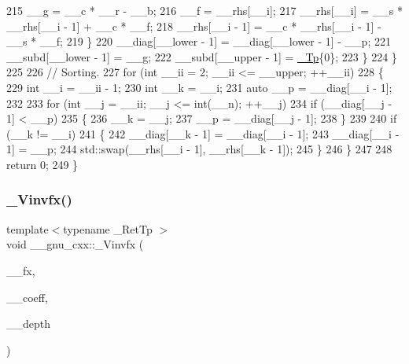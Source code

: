 \begin{DoxyCode}
215                   \_\_g = \_\_c * \_\_r - \_\_b;
216                   \_\_f = \_\_rhs[\_\_i];
217                   \_\_rhs[\_\_i] = \_\_s * \_\_rhs[\_\_i - 1] + \_\_c * \_\_f;
218                   \_\_rhs[\_\_i - 1] = \_\_c * \_\_rhs[\_\_i - 1] - \_\_s * \_\_f;
219                 \}
220               \_\_diag[\_\_lower - 1] = \_\_diag[\_\_lower - 1] - \_\_p;
221               \_\_subd[\_\_lower - 1] = \_\_g;
222               \_\_subd[\_\_upper - 1] = \hyperlink{namespace____gnu__cxx_a3b19a9c800ca194374ef9172290f7d79}{\_Tp}\{0\};
223             \}
224         \}
225 
226       \textcolor{comment}{// Sorting.}
227       \textcolor{keywordflow}{for} (\textcolor{keywordtype}{int} \_\_ii = 2; \_\_ii <= \_\_upper; ++\_\_ii)
228         \{
229           \textcolor{keywordtype}{int} \_\_i = \_\_ii - 1;
230           \textcolor{keywordtype}{int} \_\_k = \_\_i;
231           \textcolor{keyword}{auto} \_\_p = \_\_diag[\_\_i - 1];
232 
233           \textcolor{keywordflow}{for} (\textcolor{keywordtype}{int} \_\_j = \_\_ii; \_\_j <= int(\_\_n); ++\_\_j)
234             \textcolor{keywordflow}{if} (\_\_diag[\_\_j - 1] < \_\_p)
235               \{
236                 \_\_k = \_\_j;
237                 \_\_p = \_\_diag[\_\_j - 1];
238               \}
239 
240           \textcolor{keywordflow}{if} (\_\_k != \_\_i)
241             \{
242               \_\_diag[\_\_k - 1] = \_\_diag[\_\_i - 1];
243               \_\_diag[\_\_i - 1] = \_\_p;
244               std::swap(\_\_rhs[\_\_i - 1], \_\_rhs[\_\_k - 1]);
245             \}
246         \}
247 
248       \textcolor{keywordflow}{return} 0;
249     \}
\end{DoxyCode}
\mbox{\label{namespace____gnu__cxx_a6215f0335d2b6f478726299660ccca4e}} 
\subsubsection{\texorpdfstring{\+\_\+\+Vinvfx()}{\_Vinvfx()}}
{\footnotesize\ttfamily template$<$typename \+\_\+\+Ret\+Tp $>$ \\
void \+\_\+\+\_\+gnu\+\_\+cxx\+::\+\_\+\+Vinvfx (\begin{DoxyParamCaption}\item[{const std\+::array$<$ \hyperlink{namespace____gnu__cxx_a886e03ece3d53ff7fa6c098a40f93fa5}{\+\_\+\+Ret\+Tp}, 33 $>$ \&}]{\+\_\+\+\_\+fx,  }\item[{\hyperlink{namespace____gnu__cxx_a886e03ece3d53ff7fa6c098a40f93fa5}{\+\_\+\+Ret\+Tp} $\ast$}]{\+\_\+\+\_\+coeff,  }\item[{const int}]{\+\_\+\+\_\+depth }\end{DoxyParamCaption})}

